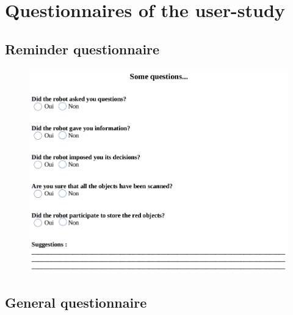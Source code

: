 \chapter{Questionnaires of the user-study}
\label{chap:annexe3}

\section{Reminder questionnaire}


\begin{figure}[!h]
	\centering
    \includegraphics[width=\textwidth]{figs/Chapter5/Questionnaire_rappel_english.png}
    \caption{}
    \label{fig:Questionnaire_rappel_english}
\end{figure}

\newpage
\section{General questionnaire}

